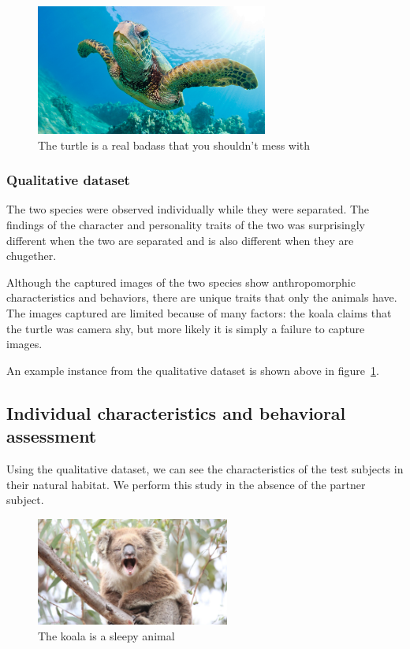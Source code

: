 \documentclass[conference]{IEEEtran}
\begin{document}
\begin{figure}[!h]
\centering
\includegraphics[width=3in]{figures/turtle-badass.jpg}
\caption{The turtle is a real badass that you shouldn't mess with}
\label{fig:turtle_badass}
\end{figure}


\subsubsection{Qualitative dataset}
The two species were observed individually while they were separated. The findings of the character and personality traits of the two was surprisingly different when the two are separated and is also different when they are chugether.

Although the captured images of the two species show anthropomorphic characteristics and behaviors, there are unique traits that only the animals have. The images captured are limited because of many factors: the koala claims that the turtle was camera shy, but more likely it is simply a failure to capture images.

An example instance from the qualitative dataset is shown above in figure~\ref{fig:turtle_badass}.

\subsection{Individual characteristics and behavioral assessment}

Using the qualitative dataset, we can see the characteristics of the test subjects in their natural habitat. We perform this study in the absence of the partner subject.


\begin{figure}[]
\centering
\includegraphics[width=2.5in]{figures/koala-yawning.jpg}
\caption{The koala is a sleepy animal}
\label{fig:koala_sleepy}
\end{figure}
\end{document}
